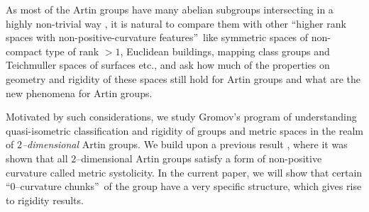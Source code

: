 \documentclass[11pt]{amsart}
\theoremstyle{definition}
\begin{document}

As most of the Artin groups have many abelian subgroups intersecting in a highly non-trivial way \cite{davis2017determining}, it is natural to compare them with other \textquotedblleft higher rank spaces with non-positive-curvature features\textquotedblright\, like symmetric spaces of non-compact type of rank $>1$, Euclidean buildings, mapping class groups and Teichmuller spaces of surfaces etc., and ask how much of the properties on geometry and rigidity of these spaces still hold for Artin groups and what are the new phenomena for Artin groups. 




Motivated by such considerations, we study Gromov's program of understanding quasi-isometric classification and rigidity of groups and metric spaces in the realm of \emph{$2$--dimensional} Artin groups. We build upon a previous result \cite{Artinmetric}, where it was shown that all $2$--dimensional Artin groups satisfy a form of non-positive curvature called metric systolicity. In the current paper, we will show that certain \textquotedblleft $0$--curvature chunks\textquotedblright\ of the group have a very specific structure, which gives rise to rigidity results.
\end{document}

